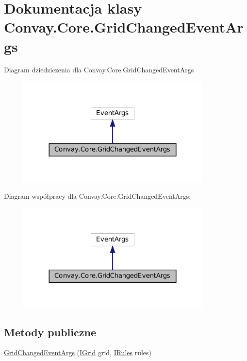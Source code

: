 \hypertarget{class_convay_1_1_core_1_1_grid_changed_event_args}{}\section{Dokumentacja klasy Convay.\+Core.\+Grid\+Changed\+Event\+Args}
\label{class_convay_1_1_core_1_1_grid_changed_event_args}


Diagram dziedziczenia dla Convay.\+Core.\+Grid\+Changed\+Event\+Args
\nopagebreak
\begin{figure}[H]
\begin{center}
\leavevmode
\includegraphics[width=276pt]{class_convay_1_1_core_1_1_grid_changed_event_args__inherit__graph}
\end{center}
\end{figure}


Diagram współpracy dla Convay.\+Core.\+Grid\+Changed\+Event\+Args\+:
\nopagebreak
\begin{figure}[H]
\begin{center}
\leavevmode
\includegraphics[width=276pt]{class_convay_1_1_core_1_1_grid_changed_event_args__coll__graph}
\end{center}
\end{figure}
\subsection*{Metody publiczne}
\begin{DoxyCompactItemize}
\item 
\hyperlink{class_convay_1_1_core_1_1_grid_changed_event_args_aac0e73356d65dff57090526ed694b024}{Grid\+Changed\+Event\+Args} (\hyperlink{interface_convay_1_1_core_1_1_interfaces_1_1_i_grid}{I\+Grid} grid, \hyperlink{interface_convay_1_1_core_1_1_interfaces_1_1_i_rules}{I\+Rules} rules)
\end{DoxyCompactItemize}
